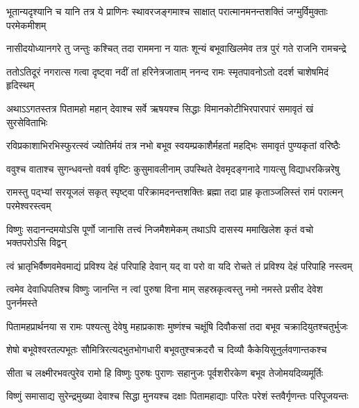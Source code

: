 \fourlineindentedshloka
{भूतान्यदृश्यानि च यानि तत्र}
{ये प्राणिनः स्थावरजङ्गमाश्च}
{साक्षात् परात्मानमनन्तशक्तिं}
{जग्मुर्विमुक्ताः परमेकमीशम्} %

\fourlineindentedshloka
{नासीदयोध्यानगरे तु जन्तुः}
{कश्चित् तदा राममना न यातः}
{शून्यं बभूवाखिलमेव तत्र}
{पुरं गते राजनि रामचन्द्रे} %

\fourlineindentedshloka
{ततोऽतिदूरं नगरात्स गत्वा}
{दृष्ट्वा नदीं तां हरिनेत्रजाताम्}
{ननन्द रामः स्मृतपावनोऽतो}
{ददर्श चाशेषमिदं हृदिस्थम्} %

\fourlineindentedshloka
{अथाऽऽगतस्तत्र पितामहो महान्}
{देवाश्च सर्वे ऋषयश्च सिद्धाः}
{विमानकोटीभिरपारपारं}
{समावृतं खं सुरसेविताभिः} %

\fourlineindentedshloka
{रविप्रकाशाभिरभिस्फुरत्स्वं}
{ज्योतिर्मयं तत्र नभो बभूव}
{स्वयम्प्रकाशैर्महतां महद्भिः}
{समावृतं पुण्यकृतां वरिष्ठैः} %

\fourlineindentedshloka
{ववुश्च वाताश्च सुगन्धवन्तो}
{ववर्ष वृष्टिः कुसुमावलीनाम्}
{उपस्थिते देवमृदङ्गनादे}
{गायत्सु विद्याधरकिन्नरेषु} %

\fourlineindentedshloka
{रामस्तु पद्भ्यां सरयूजलं सकृत्}
{स्पृष्ट्वा परिक्रामदनन्तशक्तिः}
{ब्रह्मा तदा प्राह कृताञ्जलिस्तं}
{रामं परात्मन् परमेश्वरस्त्वम्} %

\fourlineindentedshloka
{विष्णुः सदानन्दमयोऽसि पूर्णो}
{जानासि तत्त्वं निजमैशमेकम्}
{तथाऽपि दासस्य ममाखिलेश}
{कृतं वचो भक्तपरोऽसि विद्वन्} %

\fourlineindentedshloka
{त्वं भ्रातृभिर्वैष्णवमेवमाद्यं}
{प्रविश्य देहं परिपाहि देवान्}
{यद् वा परो वा यदि रोचते तं}
{प्रविश्य देहं परिपाहि नस्त्वम्} %

\fourlineindentedshloka
{त्वमेव देवाधिपतिश्च विष्णुः}
{जानन्ति न त्वां पुरुषा विना माम्}
{सहस्रकृत्वस्तु नमो नमस्ते}
{प्रसीद देवेश पुनर्नमस्ते} %

\fourlineindentedshloka
{पितामहप्रार्थनया स रामः}
{पश्यत्सु देवेषु महाप्रकाशः}
{मुष्णंश्च चक्षूंषि दिवौकसां तदा}
{बभूव चक्रादियुतश्चतुर्भुजः} %

\fourlineindentedshloka
{शेषो बभूवेश्वरतल्पभूतः}
{सौमित्रिरत्यद्भुतभोगधारी}
{बभूवतुश्चक्रदरौ च दिव्यौ}
{कैकेयिसूनुर्लवणान्तकश्च} %

\fourlineindentedshloka
{सीता च लक्ष्मीरभवत्पुरेव}
{रामो हि विष्णुः पुरुषः पुराणः}
{सहानुजः पूर्वशरीरकेण}
{बभूव तेजोमयदिव्यमूर्तिः} %

\fourlineindentedshloka
{विष्णुं समासाद्य सुरेन्द्रमुख्या}
{देवाश्च सिद्धा मुनयश्च दक्षाः}
{पितामहाद्याः परितः परेशं}
{स्तवैर्गृणन्तः परिपूजयन्तः} %

